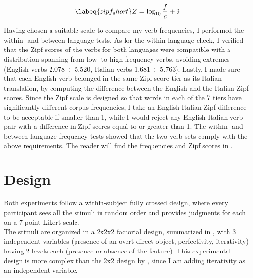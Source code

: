 \begin{equation} \labeq{zipf_short}
Z = \log _{10} \frac{f}{c} + 9
\end{equation}

Having chosen a suitable scale to compare my verb frequencies, I performed the within- and between-language tests. As for the within-language check, I verified that the Zipf scores of the verbs for both languages were compatible with a distribution spanning from low- to high-frequency verbs, avoiding extremes (English verbs 2.078 $\div$ 5.520, Italian verbs 1.681 $\div$ 5.763). Lastly, I made sure that each English verb belonged in the same Zipf score tier as its Italian translation, by computing the difference between the English and the Italian Zipf scores. Since the Zipf scale is designed so that words in each of the 7 tiers have significantly different corpus frequencies, I take an English-Italian Zipf difference to be acceptable if smaller than 1, while I would reject any English-Italian verb pair with a difference in Zipf scores equal to or greater than 1. The within- and between-language frequency tests showed that the two verb sets comply with the above requirements. The reader will find the frequencies and Zipf scores in .


\section{Design} 

Both experiments follow a within-subject fully crossed design, where every participant sees all the stimuli in random order and provides judgments for each on a 7-point Likert scale.\\
The stimuli are organized in a 2x2x2 factorial design, summarized in , with 3 independent variables (presence of an overt direct object, perfectivity, iterativity) having 2 levels each (presence or absence of the feature). This experimental design is more complex than the 2x2 design by \textcite{Medina2007}, since I am adding iterativity as an independent variable.

